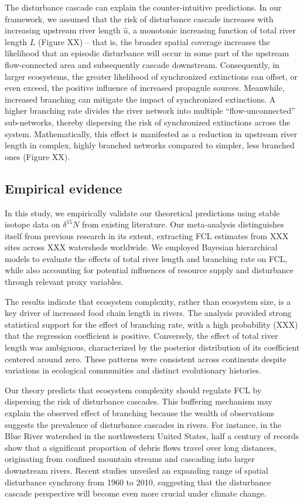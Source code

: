 \documentclass[11pt, class=article, crop=false]{standalone}
\begin{document}
The disturbance cascade can explain the counter-intuitive predictions.
In our framework, we assumed that the risk of disturbance cascade increases with increasing upstream river length $\hat{u}$, a monotonic increasing function of total river length $L$ (Figure XX) -- that is, the broader spatial coverage increases the likelihood that an episodic disturbance will occur in some part of the upstream flow-connected area and subsequently cascade downstream.
Consequently, in larger ecosystems, the greater likelihood of synchronized extinctions can offset, or even exceed, the positive influence of increased propagule sources.
Meanwhile, increased branching can mitigate the impact of synchronized extinctions.
A higher branching rate divides the river network into multiple ``flow-unconnected'' sub-networks, thereby dispersing the risk of synchronized extinctions across the system. Mathematically, this effect is manifested as a reduction in upstream river length in complex, highly branched networks compared to simpler, less branched ones (Figure XX).

\subsection{Empirical evidence}

In this study, we empirically validate our theoretical predictions using stable isotope data on $\delta^{15}N$ from existing literature.
Our meta-analysis distinguishes itself from previous research in its extent, extracting FCL estimates from XXX sites across XXX watersheds worldwide.
We employed Bayesian hierarchical models to evaluate the effects of total river length and branching rate on FCL, while also accounting for potential influences of resource supply and disturbance through relevant proxy variables.

The results indicate that ecosystem complexity, rather than ecosystem size, is a key driver of increased food chain length in rivers.
The analysis provided strong statistical support for the effect of branching rate, with a high probability (XXX) that the regression coefficient is positive.
Conversely, the effect of total river length was ambiguous, characterized by the posterior distribution of its coefficient centered around zero.
These patterns were consistent across continents despite variations in ecological communities and distinct evolutionary histories. 

Our theory predicts that ecosystem complexity should regulate FCL by dispersing the risk of disturbance cascades.
This buffering mechanism may explain the observed effect of branching because the wealth of observations suggests the prevalence of disturbance cascades in rivers.
For instance, in the Blue River watershed in the northwestern United States, half a century of records show that a significant proportion of debris flows travel over long distances, originating from confined mountain streams and cascading into larger downstream rivers.
Recent studies unveiled an expanding range of spatial disturbance synchrony from 1960 to 2010, suggesting that the disturbance cascade perspective will become even more crucial under climate change.
\end{document}

